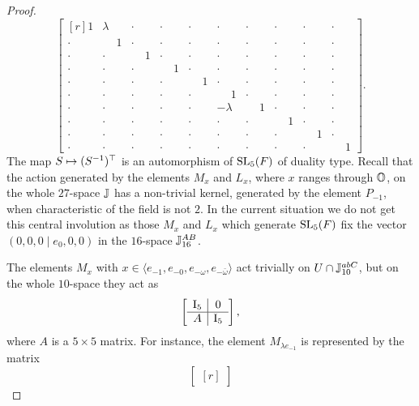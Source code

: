 \begin{proof}
\begin{equation*}
\begin{bmatrix}[r]
		1 & \lambda & \cdot & \cdot & \cdot & \cdot & \cdot & \cdot & \cdot & \cdot  \\
		 \cdot & \phantom{-}1 & \cdot & \cdot & \cdot & \cdot & \cdot & \cdot & \cdot & \cdot  \\
		 \cdot & \cdot & \phantom{-}1 &  \cdot & \cdot & \cdot & \cdot & \cdot & \cdot & \cdot \\
		  \cdot & \cdot & \cdot & \phantom{-}1 & \cdot & \cdot & \cdot & \cdot & \cdot & \cdot \\
		  \cdot & \cdot & \cdot & \cdot & \phantom{-}1 & \cdot & \cdot & \cdot & \cdot & \cdot \\
		  \cdot & \cdot & \cdot & \cdot & \cdot & \phantom{-}1 &  \cdot & \cdot & \cdot & \cdot \\
		  \cdot & \cdot & \cdot & \cdot & \cdot & -\lambda & \phantom{-}1 &  \cdot & \cdot & \cdot  \\
		  \cdot & \cdot & \cdot & \cdot & \cdot & \cdot & \cdot & \phantom{-}1 &  \cdot & \cdot \\
		  \cdot & \cdot & \cdot & \cdot & \cdot & \cdot & \cdot & \cdot & \phantom{-}1 & \cdot \\
		  \cdot & \cdot & \cdot & \cdot & \cdot & \cdot & \cdot & \cdot & \cdot & \phantom{-}1  
	
	\end{bmatrix}.
	\end{equation*}
The map $S \mapsto (S^{-1})^{\top}$ is an automorphism of 
$\mathrm{SL}_5(F)$ of duality type. Recall that the action 
generated by the
 elements $M_x$ and $L_x$, where $x$ ranges through $\mathbb{O}$, 
 on the whole $27$-space $\mathbb{J}$ has a non-trivial kernel,
 generated by the element $P_{-1}$, when characteristic of 
 the field is not $2$. In the current situation we do not
 get this central involution as those $M_x$ and $L_x$ which 
 generate $\mathrm{SL}_5(F)$ fix the vector $(0,0,0 \mid e_0,0,0)$
 in the $16$-space $\mathbb{J}_{16}^{AB}$.


The elements $M_x$ with $x \in \langle e_{-1}, e_{-0}, e_{-\omega}, e_{-\bar{\omega}} \rangle$ act trivially on $U\cap \mathbb{J}_{10}^{abC}$, but
	on the whole $10$-space they act as
	\begin{equation*}
		\left[
			\begin{array}{c|c}
				\mathord{\mathrm{I}}_5 & 0 \\ \hline
				A & \mathord{\mathrm{I}}_5
			\end{array}
		\right],
	\end{equation*}
	where $A$ is a $5 \times 5$ matrix. For instance, the element $M_{\lambda e_{-1}}$ is represented by the matrix
	\begin{equation*}
	\begin{bmatrix}[r]
	

\end{bmatrix}
\end{equation*}
\end{proof}
